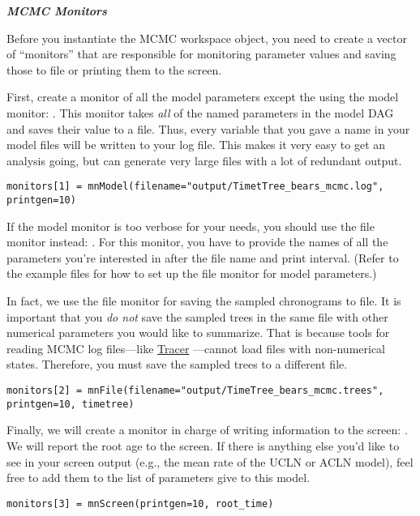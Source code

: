 \textbf{\textit{MCMC Monitors}}

Before you instantiate the MCMC workspace object, you need to create a vector of ``monitors'' that are responsible for monitoring parameter values and saving those to file or printing them to the screen. 

First, create a monitor of all the model parameters except the  using the model monitor: .
This monitor takes \textit{all} of the named parameters in the model DAG and saves their value to a file. 
Thus, every variable that you gave a name in your model files will be written to your log file. 
This makes it very easy to get an analysis going, but can generate very large files with a lot of redundant output. 
{\tt \begin{snugshade*}
\begin{lstlisting}
monitors[1] = mnModel(filename="output/TimetTree_bears_mcmc.log", printgen=10)
\end{lstlisting}
\end{snugshade*}}

If the model monitor is too verbose for your needs, you should use the file monitor instead: . For this monitor, you have to provide the names of all the parameters you're interested in after the file name and print interval. 
(Refer to the example files for how to set up the file monitor for model parameters.)

In fact, we use the file monitor for saving the sampled chronograms to file. 
It is important that you \textit{do not} save the sampled trees in the same file with other numerical parameters you would like to summarize. That is because tools for reading MCMC log files---like \href{http://tree.bio.ed.ac.uk/software/tracer/}{Tracer} \citep{rambaut09}---cannot load files with non-numerical states.
Therefore, you must save the sampled trees to a different file.
{\tt \begin{snugshade*}
\begin{lstlisting}
monitors[2] = mnFile(filename="output/TimeTree_bears_mcmc.trees", printgen=10, timetree)
\end{lstlisting}
\end{snugshade*}}


Finally, we will create a monitor in charge of writing information to the screen: .
We will report the root age to the screen. If there is anything else you'd like to see in your screen output (e.g., the mean rate of the UCLN or ACLN model), feel free to add them to the list of parameters give to this model.
{\tt \begin{snugshade*}
\begin{lstlisting}
monitors[3] = mnScreen(printgen=10, root_time)
\end{lstlisting}
\end{snugshade*}}

